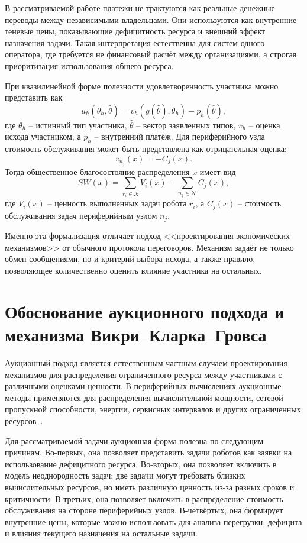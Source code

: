 В рассматриваемой работе платежи не трактуются как реальные денежные переводы между независимыми владельцами. Они используются как внутренние теневые цены, показывающие дефицитность ресурса и внешний эффект назначения задачи. Такая интерпретация естественна для систем одного оператора, где требуется не финансовый расчёт между организациями, а строгая приоритизация использования общего ресурса.

При квазилинейной форме полезности удовлетворенность участника можно представить как
\[
u_h(\theta_h,\widehat{\theta}) = v_h(g(\widehat{\theta}),\theta_h) - p_h(\widehat{\theta}),
\]
где $\theta_h$ -- истинный тип участника, $\widehat{\theta}$ -- вектор заявленных типов, $v_h$ -- оценка исхода участником, а $p_h$ -- внутренний платёж. Для периферийного узла стоимость обслуживания может быть представлена как отрицательная оценка:
\[
v_{n_j}(x) = - C_j(x).
\]
Тогда общественное благосостояние распределения $x$ имеет вид
\[
SW(x) = \sum_{r_i \in \mathcal{R}} V_i(x) - \sum_{n_j \in \mathcal{N}} C_j(x),
\]
где $V_i(x)$ -- ценность выполненных задач робота $r_i$, а $C_j(x)$ -- стоимость обслуживания задач периферийным узлом $n_j$.

Именно эта формализация отличает подход <<проектирования экономических механизмов>> от обычного протокола переговоров. Механизм задаёт не только обмен сообщениями, но и критерий выбора исхода, а также правило, позволяющее количественно оценить влияние участника на остальных.

\section{Обоснование аукционного подхода и механизма Викри--Кларка--Гровса}

Аукционный подход является естественным частным случаем проектирования механизмов для распределения ограниченного ресурса между участниками с различными оценками ценности. В периферийных вычислениях аукционные методы применяются для распределения вычислительной мощности, сетевой пропускной способности, энергии, сервисных интервалов и других ограниченных ресурсов~\cite{Qiu2022AuctionEdgeSurvey,Wu2025PRATO,Huang2023AuctionResourceAllocation,Chen2022EndToEndAuction,Habiba2024RepeatedAuction,McAfee1992DoubleAuction,MyersonSatterthwaite1983}.

Для рассматриваемой задачи аукционная форма полезна по следующим причинам. Во-первых, она позволяет представить задачи роботов как заявки на использование дефицитного ресурса. Во-вторых, она позволяет включить в модель неоднородность задач: две задачи могут требовать близких вычислительных ресурсов, но иметь различную ценность из-за разных сроков и критичности. В-третьих, она позволяет включить в распределение стоимость обслуживания на стороне периферийных узлов. В-четвёртых, она формирует внутренние цены, которые можно использовать для анализа перегрузки, дефицита и влияния текущего назначения на остальные задачи.

